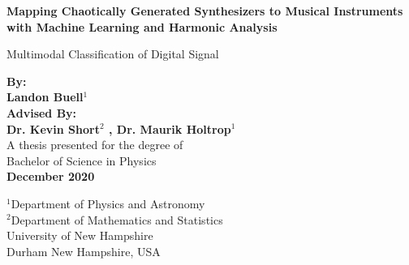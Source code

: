 \documentclass[12pt,letterpaper]{article}
\begin{document}

\begin{titlepage}
	\begin{center}
   		\vspace*{1cm}
       	\begin{LARGE}
       	\textbf{Mapping Chaotically Generated Synthesizers to Musical Instruments with Machine Learning and Harmonic Analysis} \\
       	\end{LARGE}
       	\vspace{1cm}
       	\begin{Large}
       	Multimodal Classification of Digital Signal
       	\end{Large}             
       	\vspace{1.5cm}

       	\textbf{By: \\ Landon Buell$^1$} \\       
       	\vspace{0.5cm}
       	\textbf{Advised By: \\ Dr. Kevin Short$^2$ , Dr. Maurik Holtrop$^1$} \\
      	\vspace{1cm}
      	A thesis presented for the degree of\\
       	Bachelor of Science in Physics \\
       	\vspace{0.5cm}
       	\textbf{December 2020}
        \vspace{1cm}

       	\vfill
      
       	\vspace{1cm}              
       	$^1$Department of Physics and Astronomy\\           
       	$^2$Department of Mathematics and Statistics\\
       	\vspace{0.5cm}  
       	University of New Hampshire\\
       	Durham New Hampshire, USA\\            
   \end{center}
\end{titlepage}

\tableofcontents

\end{document}
